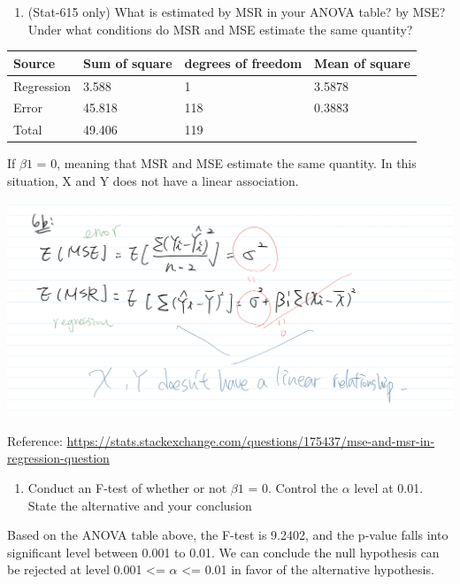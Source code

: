 \documentclass[
]{article}
\providecommand{\tightlist}{%
  \setlength{\itemsep}{0pt}\setlength{\parskip}{0pt}}
\begin{document}
\begin{enumerate}
\def\labelenumi{(\alph{enumi})}
\setcounter{enumi}{1}
\tightlist
\item
  (Stat-615 only) What is estimated by MSR in your ANOVA table? by MSE?
  Under what conditions do MSR and MSE estimate the same quantity?\\
\end{enumerate}

\begin{longtable}[]{@{}llll@{}}
\toprule
Source & Sum of square & degrees of freedom & Mean of
square\tabularnewline
\midrule
\endhead
Regression & 3.588 & 1 & 3.5878\tabularnewline
Error & 45.818 & 118 & 0.3883\tabularnewline
Total & 49.406 & 119 &\tabularnewline
\bottomrule
\end{longtable}

If \(\beta1\) = 0, meaning that MSR and MSE estimate the same quantity.
In this situation, X and Y does not have a linear association.

\includegraphics{pics/Screen Shot 2021-02-21 at 3.36.08 PM.png}

Reference:
\url{https://stats.stackexchange.com/questions/175437/mse-and-msr-in-regression-question}

\begin{enumerate}
\def\labelenumi{(\alph{enumi})}
\setcounter{enumi}{2}
\tightlist
\item
  Conduct an F-test of whether or not \(\beta1\) = 0. Control the
  \(\alpha\) level at 0.01. State the alternative and your conclusion
\end{enumerate}

Based on the ANOVA table above, the F-test is 9.2402, and the p-value
falls into significant level between 0.001 to 0.01. We can conclude the
null hypothesis can be rejected at level 0.001 \textless= \(\alpha\)
\textless= 0.01 in favor of the alternative hypothesis.
\end{document}
